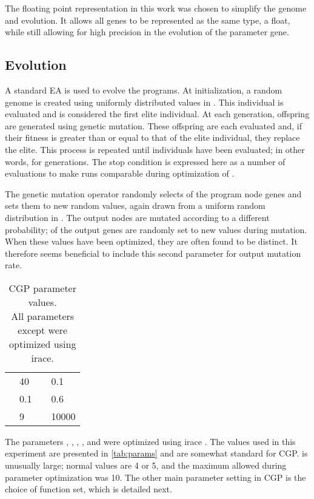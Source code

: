 \documentclass[sigconf,screen]{acmart}\settopmatter{printfolios=true,printacmref=false}
\begin{document}
\begin{algorithmic}
    \STATE 
  \ENDFOR
    \STATE 
  \ENDFOR
\end{algorithmic}

The floating point representation in this work was chosen to simplify the genome
and evolution. It allows all genes to be represented as the same type, a float,
while still allowing for high precision in the evolution of the parameter gene.

\subsection{Evolution}

A standard  EA is used to evolve the programs. At initialization, a
random genome is created using  uniformly distributed values in .
This individual is evaluated and is considered the first elite individual. At
each generation,  offspring are generated using genetic mutation. These
offspring are each evaluated and, if their fitness is greater than or equal to
that of the elite individual, they replace the elite. This process is repeated
until  individuals have been evaluated; in other words, for
 generations. The stop condition is expressed here as
a number of evaluations to make runs comparable during optimization of
.

The genetic mutation operator randomly selects  of the program node
genes and sets them to new random values, again drawn from a uniform random
distribution in . The output nodes are mutated according to a
different probability;  of the output genes are randomly set to new
values during mutation. When these values have been optimized, they are often
found to be distinct. It therefore seems beneficial to include this second
parameter for output mutation rate.

\begin{table}[th]
  \begin{tabular}{l l | l l}
     & 40 &  & 0.1\\
     & 0.1 &  & 0.6\\
     & 9 &  & 10000
  \end{tabular}
  \caption{CGP parameter values.\\All parameters except  were optimized
    using irace.}
  \label{tab:params}
\end{table}

The parameters , , , , and  were optimized
using irace \cite{lopez2016irace}. The values used in this experiment are
presented in \autoref{tab:params} and are somewhat standard for CGP. 
is unusually large; normal values are 4 or 5, and the maximum allowed during
parameter optimization was 10. The other main parameter setting in CGP is the
choice of function set, which is detailed next.
\end{document}
